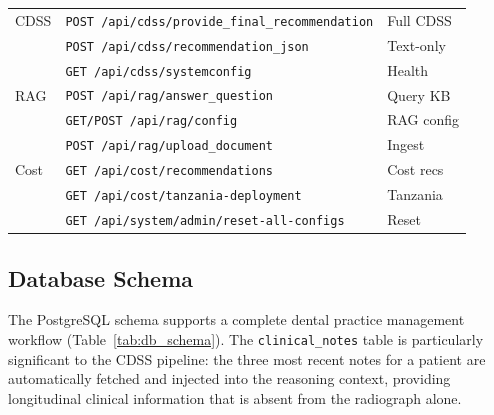 \documentclass[12pt,a4paper]{report}
\begin{document}
\begin{table}[H]
\begin{tabularx}{\textwidth}{>{\raggedright\arraybackslash}p{2.2cm} X >{\raggedright\arraybackslash}p{3.8cm}}
				\midrule
				CDSS
				& \texttt{POST /api/cdss/provide\_final\_recommendation} & Full CDSS \\
				& \texttt{POST /api/cdss/recommendation\_json}          & Text-only \\
				& \texttt{GET  /api/cdss/systemconfig}                  & Health \\
				\midrule
				RAG
				& \texttt{POST /api/rag/answer\_question}  & Query KB \\
				& \texttt{GET/POST /api/rag/config}        & RAG config \\
				& \texttt{POST /api/rag/upload\_document}  & Ingest \\
				\midrule
				Cost
				& \texttt{GET /api/cost/recommendations}         & Cost recs \\
				& \texttt{GET /api/cost/tanzania-deployment}     & Tanzania \\
				& \texttt{GET /api/system/admin/reset-all-configs} & Reset \\
				\bottomrule
			\end{tabularx}
		\end{table}
	
	
	
	\subsection*{Database Schema}
	
	The PostgreSQL schema supports a complete dental practice management workflow
	(Table~\ref{tab:db_schema}). The \texttt{clinical\_notes} table is particularly significant
	to the CDSS pipeline: the three most recent notes for a patient are automatically fetched
	and injected into the reasoning context, providing longitudinal clinical information that
	is absent from the radiograph alone.
	
\end{document}
